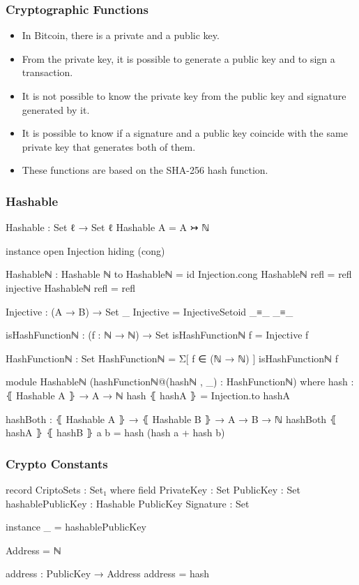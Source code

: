\documentclass{beamer}
\begin{document}
\begin{frame}
  \frametitle{Cryptographic Functions}
  \begin{itemize}[<+->]
    \item In Bitcoin, there is a private and a public key.
    \item From the private key, it is possible to generate a public key
 and to sign a transaction.
    \item It is not possible to know the private key from the public key and signature generated by it.
    \item It is possible to know if a signature and a public key coincide with the same private key that generates both of them.
    \item These functions are based on the SHA-256 hash function.
  \end{itemize}
\end{frame}


\begin{frame}
  \frametitle{Hashable}
\begin{code}
Hashable : Set ℓ → Set ℓ
Hashable A = A ↣ ℕ

instance
  open Injection hiding (cong)

  Hashableℕ : Hashable ℕ
  to Hashableℕ = id
  Injection.cong Hashableℕ refl = refl
  injective Hashableℕ refl = refl

Injective : (A → B) → Set _
Injective = InjectiveSetoid _≡_ _≡_

isHashFunctionℕ : (f : ℕ → ℕ) → Set
isHashFunctionℕ f = Injective f

HashFunctionℕ : Set
HashFunctionℕ = Σ[ f ∈ (ℕ → ℕ) ] isHashFunctionℕ f

module Hashableℕ (hashFunctionℕ@(hashℕ , _) : HashFunctionℕ) where
  hash : ⦃ Hashable A ⦄ → A → ℕ
  hash ⦃ hashA ⦄ = Injection.to hashA

  hashBoth : ⦃ Hashable A ⦄ → ⦃ Hashable B ⦄ → A → B → ℕ
  hashBoth ⦃ hashA ⦄ ⦃ hashB ⦄ a b = hash (hash a + hash b)
\end{code}


\end{frame}


\begin{frame}
  \frametitle{Crypto Constants}
\begin{code}
  record CriptoSets : Set₁ where
    field
      PrivateKey         : Set
      PublicKey          : Set
      hashablePublicKey  : Hashable PublicKey
      Signature          : Set

    instance
      _ = hashablePublicKey

    Address = ℕ

    address : PublicKey → Address
    address = hash
\end{code}

\end{frame}
\end{document}
